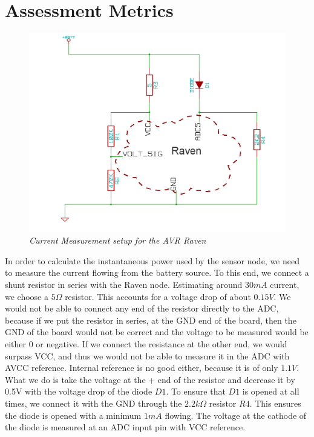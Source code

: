 \section{Assessment Metrics}
\label{sec:metrics}

\begin{figure}[ht]
 \begin{center}
  \includegraphics[width=120mm]{static/masurare.png}
 \end{center}
\caption{\small \itshape{Current Measurement setup for the AVR Raven}}

\end{figure}

In order to calculate the instantaneous power used by the sensor node, we need to measure the current flowing from the battery source.
To this end, we connect a shunt resistor in series with the Raven node. Estimating around $30mA$ current, we choose a $5\Omega$ resistor. This
accounts for a voltage drop of about $0.15V$. We would not be able to connect any end of the resistor directly to the ADC, because
if we put the resistor in series, at the GND end of the board, then the GND of the board would not be correct and the voltage
to be measured would be either 0 or negative. If we connect the resistance at the other end, we would surpass VCC, and thus we would not
be able to measure it in the ADC with AVCC reference. Internal reference is no good either, because it is of only $1.1V$. What we 
do is take the voltage at the + end of the resistor and decrease it by 0.5V with the voltage drop of the diode $D1$. To ensure
that $D1$ is opened at all times, we connect it with the GND through the $2.2k\Omega$ resistor $R4$. This ensures the diode is opened
with a minimum $1mA$ flowing. The voltage at the cathode of the diode is measured at an ADC input pin with VCC reference.

